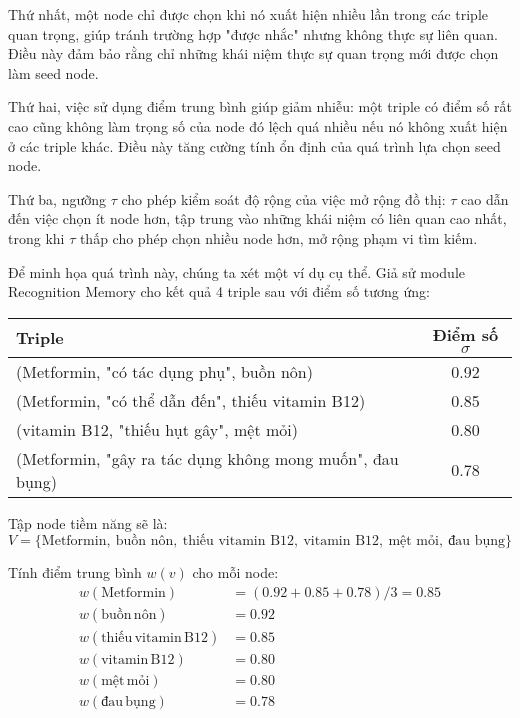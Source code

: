 \documentclass[../main.tex]{subfiles}
\begin{document}
Thứ nhất, một node chỉ được chọn khi nó xuất hiện nhiều lần trong các triple quan trọng, giúp tránh trường hợp "được nhắc" nhưng không thực sự liên quan. Điều này đảm bảo rằng chỉ những khái niệm thực sự quan trọng mới được chọn làm seed node.

Thứ hai, việc sử dụng điểm trung bình giúp giảm nhiễu: một triple có điểm số rất cao cũng không làm trọng số của node đó lệch quá nhiều nếu nó không xuất hiện ở các triple khác. Điều này tăng cường tính ổn định của quá trình lựa chọn seed node.

Thứ ba, ngưỡng \(\tau\) cho phép kiểm soát độ rộng của việc mở rộng đồ thị: \(\tau\) cao dẫn đến việc chọn ít node hơn, tập trung vào những khái niệm có liên quan cao nhất, trong khi \(\tau\) thấp cho phép chọn nhiều node hơn, mở rộng phạm vi tìm kiếm.

Để minh họa quá trình này, chúng ta xét một ví dụ cụ thể. Giả sử module Recognition Memory cho kết quả 4 triple sau với điểm số tương ứng:

\begin{table}[h]
\centering
\begin{tabular}{|l|c|}
\hline
\textbf{Triple} & \textbf{Điểm số \(\sigma\)} \\
\hline
(Metformin, "có tác dụng phụ", buồn nôn) & 0.92 \\
\hline
(Metformin, "có thể dẫn đến", thiếu vitamin B12) & 0.85 \\
\hline
(vitamin B12, "thiếu hụt gây", mệt mỏi) & 0.80 \\
\hline
(Metformin, "gây ra tác dụng không mong muốn", đau bụng) & 0.78 \\
\hline
\end{tabular}
\end{table}

Tập node tiềm năng sẽ là:
\begin{equation}
V=\{\text{Metformin},\ \text{buồn nôn},\ \text{thiếu vitamin B12},\ \text{vitamin B12},\ \text{mệt mỏi},\ \text{đau bụng}\}
\end{equation}

Tính điểm trung bình \(w(v)\) cho mỗi node:
\begin{align}
w(\mathrm{Metformin}) &= (0.92 + 0.85 + 0.78)/3 = 0.85 \\
w(\mathrm{buồn\,nôn}) &= 0.92 \\
w(\mathrm{thiếu\,vitamin\,B12}) &= 0.85 \\
w(\mathrm{vitamin\,B12}) &= 0.80 \\
w(\mathrm{mệt\,mỏi}) &= 0.80 \\
w(\mathrm{đau\,bụng}) &= 0.78
\end{align}
\end{document}
